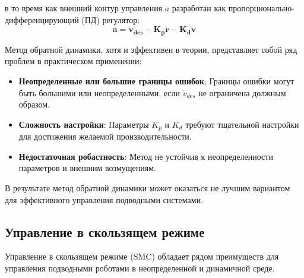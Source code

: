     в то время как внешний контур управления $a$ разработан как пропорционально-дифференцирующий (ПД) регулятор:
    \begin{equation*}
        \mathbf{a = \dot{v}_{des} - K_p \tilde{r} - K_d \tilde{v}}
    \end{equation*}

    Метод обратной динамики, хотя и эффективен в теории, представляет собой ряд проблем в практическом применении:
    \begin{itemize}
    \item \textbf{Неопределенные или большие границы ошибок}: Границы ошибки могут быть большими или неопределенными, если $\dot{v}_{des}$ не ограничена должным образом.
    \item \textbf{Сложность настройки}: Параметры $K_p$ и $K_d$ требуют тщательной настройки для достижения желаемой производительности.
    \item \textbf{Недостаточная робастность}: Метод не устойчив к неопределенности параметров и внешним возмущениям.
    \end{itemize}

    В результате метод обратной динамики может оказаться не лучшим вариантом для эффективного управления подводными системами.

\subsection{Управление в скользящем режиме}

    Управление в скользящем режиме (SMC) обладает рядом преимуществ для управления подводными роботами в неопределенной и динамичной среде.

